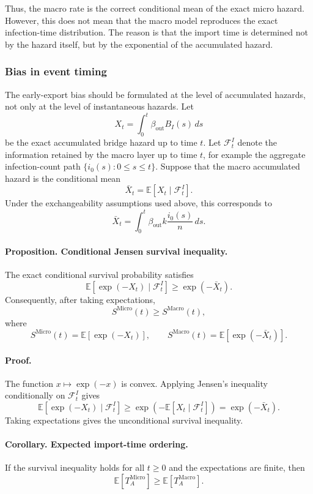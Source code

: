\documentclass[a4paper,fleqn]{cas-sc}
\newcommand{\ReadStatusTwo}[5]{}
\begin{document}
Thus, the macro rate is the correct conditional mean of the exact micro hazard. However, this does not mean that the macro model reproduces the exact infection-time distribution. The reason is that the import time is determined not by the hazard itself, but by the exponential of the accumulated hazard.

\subsubsection{Bias in event timing}
\ReadStatusTwo{Bias in event timing}{Yulian}{1}{Michael}{0}

The early-export bias should be formulated at the level of accumulated hazards, not only at the level of instantaneous hazards. Let
\[
X_t
=
\int_0^t \beta_{\mathrm{out}}B_I(s)\,ds
\]
be the exact accumulated bridge hazard up to time \(t\). Let \(\mathcal F_t^I\) denote the information retained by the macro layer up to time \(t\), for example the aggregate infection-count path \(\{i_0(s):0\le s\le t\}\). Suppose that the macro accumulated hazard is the conditional mean
\[
\bar X_t
=
\mathbb{E}\!\left[X_t\mid \mathcal F_t^I\right].
\]
Under the exchangeability assumptions used above, this corresponds to
\[
\bar X_t
=
\int_0^t \beta_{\mathrm{out}}k\frac{i_0(s)}{n}\,ds.
\]

\paragraph{Proposition. Conditional Jensen survival inequality.}
The exact conditional survival probability satisfies
\[
\mathbb{E}\!\left[\exp(-X_t)\mid\mathcal F_t^I\right]
\geq
\exp(-\bar X_t).
\]
Consequently, after taking expectations,
\[
S^{\mathrm{Micro}}(t)
\geq
S^{\mathrm{Macro}}(t),
\]
where
\[
S^{\mathrm{Micro}}(t)
=
\mathbb{E}\!\left[\exp(-X_t)\right],
\qquad
S^{\mathrm{Macro}}(t)
=
\mathbb{E}\!\left[\exp(-\bar X_t)\right].
\]

\paragraph{Proof.}
The function \(x\mapsto \exp(-x)\) is convex. Applying Jensen's inequality conditionally on \(\mathcal F_t^I\) gives
\[
\mathbb{E}\!\left[\exp(-X_t)\mid\mathcal F_t^I\right]
\geq
\exp\!\left(
-\mathbb{E}[X_t\mid\mathcal F_t^I]
\right)
=
\exp(-\bar X_t).
\]
Taking expectations gives the unconditional survival inequality.

\paragraph{Corollary. Expected import-time ordering.}
If the survival inequality holds for all \(t\ge 0\) and the expectations are finite, then
\[
\mathbb{E}[T_A^{\mathrm{Micro}}]
\geq
\mathbb{E}[T_A^{\mathrm{Macro}}].
\]
\end{document}
